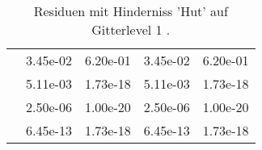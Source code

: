 \begin{table}
\begin{tabular}{c|cc|cc|}
\multicolumn{1}{|c|}{} & \multicolumn{1}{|c|}{  3.45e-02} & \multicolumn{1}{|c|}{  6.20e-01} & \multicolumn{1}{|c|}{  3.45e-02} & \multicolumn{1}{|c|}{  6.20e-01} \\ 
\multicolumn{1}{|c|}{} & \multicolumn{1}{|c|}{  5.11e-03} & \multicolumn{1}{|c|}{  1.73e-18} & \multicolumn{1}{|c|}{  5.11e-03} & \multicolumn{1}{|c|}{  1.73e-18} \\ 
\multicolumn{1}{|c|}{} & \multicolumn{1}{|c|}{  2.50e-06} & \multicolumn{1}{|c|}{  1.00e-20} & \multicolumn{1}{|c|}{  2.50e-06} & \multicolumn{1}{|c|}{  1.00e-20} \\ 
\multicolumn{1}{|c|}{} & \multicolumn{1}{|c|}{  6.45e-13} & \multicolumn{1}{|c|}{  1.73e-18} & \multicolumn{1}{|c|}{  6.45e-13} & \multicolumn{1}{|c|}{  1.73e-18} \\ 
\hline 
\end{tabular}\caption{Residuen mit Hinderniss 'Hut' auf Gitterlevel 1 .}\label{tab:Residuum_Hut_level1}
\end{table} 
